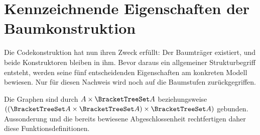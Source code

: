 \section{Kennzeichnende Eigenschaften der Baumkonstruktion}

Die Codekonstruktion hat nun ihren Zweck erfüllt: Der Baumträger
existiert, und beide Konstruktoren bleiben in ihm. Bevor daraus ein
allgemeiner Strukturbegriff entsteht, werden seine fünf entscheidenden
Eigenschaften am konkreten Modell bewiesen. Nur für diesen Nachweis
wird noch auf die Baumstufen zurückgegriffen.

\noindent\begin{minipage}{\linewidth}
\end{minipage}\par

Die Graphen sind durch \(A\times\BracketTreeSet A\) beziehungsweise
\(((\BracketTreeSet A\times\BracketTreeSet A)\times\BracketTreeSet A)\)
gebunden. Aussonderung und die bereits bewiesene Abgeschlossenheit
rechtfertigen daher diese Funktionsdefinitionen.

